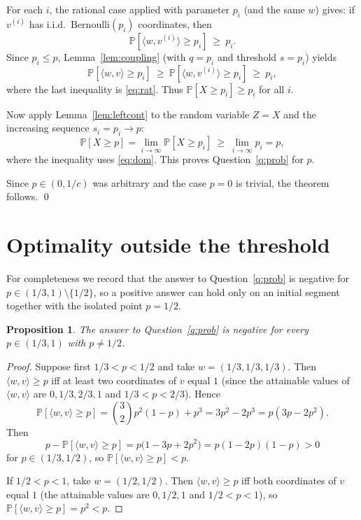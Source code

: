 \documentclass[11pt]{amsart}
\theoremstyle{plain}
\newtheorem{proposition}[theorem]{Proposition}
\theoremstyle{definition}
\def\Pb{\mathbb{P}}
\begin{document}
For each $i$, the rational case applied with parameter $p_i$ (and the same $w$)
gives: if $v^{(i)}$ has i.i.d.\ $\mathrm{Bernoulli}(p_i)$ coordinates, then
\begin{equation}\label{eq:rat}
\Pb[\langle w,v^{(i)}\rangle\ge p_i]\ \ge\ p_i .
\end{equation}
Since $p_i\le p$, Lemma~\ref{lem:coupling} (with $q=p_i$ and threshold $s=p_i$)
yields
\begin{equation}\label{eq:dom}
\Pb[\langle w,v\rangle\ge p_i]\ \ge\ \Pb[\langle w,v^{(i)}\rangle\ge p_i]\ \ge\ p_i ,
\end{equation}
where the last inequality is \eqref{eq:rat}. Thus $\Pb[X\ge p_i]\ge p_i$ for all
$i$.

Now apply Lemma~\ref{lem:leftcont} to the random variable $Z=X$ and the increasing
sequence $s_i=p_i\to p$:
\[
\Pb[X\ge p]=\lim_{i\to\infty}\Pb[X\ge p_i]\ \ge\ \lim_{i\to\infty}p_i=p ,
\]
where the inequality uses \eqref{eq:dom}. This proves Question~\ref{q:prob} for
$p$.

Since $p\in(0,1/c)$ was arbitrary and the case $p=0$ is trivial, the theorem
follows. \qed

\section{Optimality outside the threshold}

For completeness we record that the answer to Question~\ref{q:prob} is negative
for $p\in(1/3,1)\setminus\{1/2\}$, so a positive answer can hold only on an initial
segment together with the isolated point $p=1/2$.

\begin{proposition}\label{prop:counterexample}
The answer to Question~\ref{q:prob} is negative for every $p\in(1/3,1)$ with
$p\ne1/2$.
\end{proposition}

\begin{proof}
Suppose first $1/3<p<1/2$ and take $w=(1/3,1/3,1/3)$. Then
$\langle w,v\rangle\ge p$ iff at least two coordinates of $v$ equal $1$ (since the
attainable values of $\langle w,v\rangle$ are $0,1/3,2/3,1$ and $1/3<p<2/3$).
Hence
\[
\Pb[\langle w,v\rangle\ge p]=\binom{3}{2}p^2(1-p)+p^3=3p^2-2p^3=p(3p-2p^2).
\]
Then
\[
p-\Pb[\langle w,v\rangle\ge p]=p\big(1-3p+2p^2\big)=p(1-2p)(1-p)>0
\]
for $p\in(1/3,1/2)$, so $\Pb[\langle w,v\rangle\ge p]<p$.

If $1/2<p<1$, take $w=(1/2,1/2)$. Then $\langle w,v\rangle\ge p$ iff both
coordinates of $v$ equal $1$ (the attainable values are $0,1/2,1$ and $1/2<p<1$),
so $\Pb[\langle w,v\rangle\ge p]=p^2<p$.
\end{proof}
\end{document}
